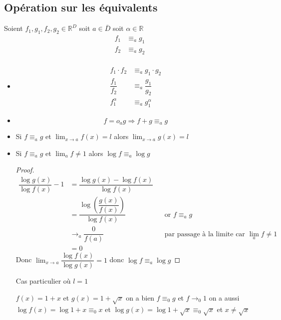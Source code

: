 \documentclass[11pt,colorlinks]{book}
\theoremstyle{mytheoremstyle}
\theoremstyle{mytheoremstyle}
\theoremstyle{mytheoremstyle}
\theoremstyle{mytheoremstyle}
\theoremstyle{mytheoremstyle}
\theoremstyle{mytheoremstyle}
\theoremstyle{mytheoremstyle}
\theoremstyle{mytheoremstyle}
\theoremstyle{myproblemstyle}
\def\mbb#1{\mathbb{#1}}
\def\bR{\mbb{R}}
\begin{document}
    \subsection{Opération sur les équivalents}
    Soient $f_1,g_1,f_2,g_2 \in \bR^D$ soit $a \in \bar{D}$ soit $\alpha \in \bR$ 
    \begin{align*}
      f_1 &\equiv_{a} g_1 \\ 
      f_2 &\equiv_{a} g_2 \\
    \end{align*}
    \begin{itemize}
      \item \begin{align*}
      f_1 \cdot f_2 &\equiv_{a} g_1 \cdot g_2 \\ 
      \dfrac{f_1}{f_2} &\equiv_{a} \dfrac{g_1}{g_2} \\
      f_1^\alpha &\equiv_{a} g_1^\alpha
    \end{align*}
    \item \begin{equation}
      f = o_{a} g \Rightarrow f + g \equiv_{a} g 
    \end{equation}
    \item Si $f \equiv_{a} g$ et $\lim_{x \to a} f(x) = l$ alors $\lim_{x \to a} g(x) = l$
    \item \begin{prop}
      Si $f \equiv_a g$ et $\lim_a f \not= 1$ alors $\log f \equiv_a \log g$
      \begin{proof}
        \begin{align*}
          \dfrac{\log g(x)}{\log f(x)} - 1 &= \dfrac{\log g(x) - \log f(x)}{\log f(x)} \\
          &= \dfrac{\log \left(\dfrac{g(x)}{f(x)}\right)}{\log f(x)} && \text{or } f \equiv_a g \\
          &\to_{a} \dfrac{0}{f(a)} && \text{par passage à la limite car } \lim_a f \not= 1 \\
          &= 0
        \end{align*}
        Donc $\lim_{x \to a} \dfrac{\log f(x)}{\log g(x)} = 1$ donc $\log f \equiv_a \log g$
      \end{proof}
    \end{prop}
    Cas particulier où $l=1$ 
    \begin{ex}
      $f(x) = 1+x$ et $g(x) = 1 + \sqrt{x}$ on a bien $f \equiv_0 g$ et $f \to_0 1$ 
      on a aussi $\log f(x) = \log 1+x \equiv_0 x$ et $\log g(x) = \log 1+\sqrt{x} \equiv_0 \sqrt{x}$ et $x \not= \sqrt{x}$
    \end{ex}
  \end{itemize}
\end{document}
